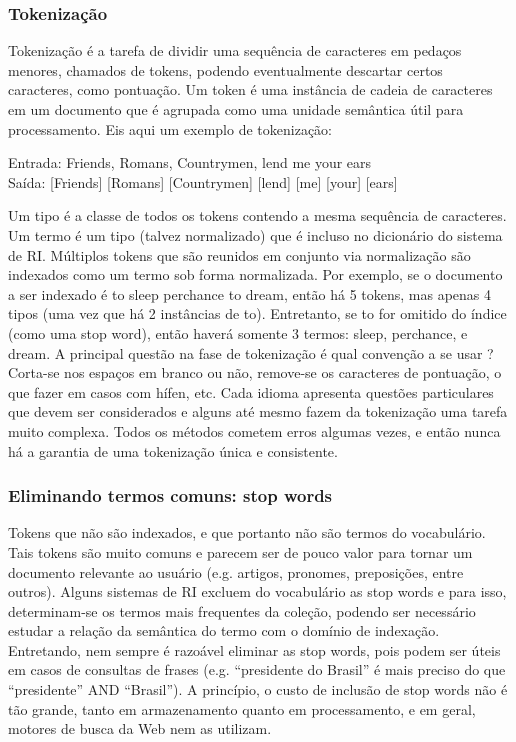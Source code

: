 \subsubsection{Tokenização}

Tokenização é a tarefa de dividir uma sequência de caracteres em pedaços menores, chamados de tokens, podendo eventualmente descartar certos caracteres, como pontuação. Um token é uma instância de cadeia de caracteres em um documento que é agrupada como uma unidade semântica útil para processamento.
Eis aqui um exemplo de tokenização:

Entrada: Friends, Romans, Countrymen, lend me your ears \\
Saída: [Friends] [Romans] [Countrymen] [lend] [me] [your] [ears]

Um tipo é a classe de todos os tokens contendo a mesma sequência de caracteres.
Um termo é um tipo (talvez normalizado) que é incluso no dicionário do sistema de RI.
Múltiplos tokens que são reunidos em conjunto via normalização são indexados como um termo sob forma normalizada. Por exemplo, se o documento a ser indexado é to sleep perchance to dream, então há 5 tokens, mas apenas 4 tipos (uma vez que há 2 instâncias de to). Entretanto, se to for omitido do índice (como uma stop word), então haverá somente 3 termos: sleep, perchance, e dream. 
A principal questão na fase de tokenização é qual convenção a se usar ? Corta-se nos espaços em branco ou não, remove-se os caracteres de pontuação, o que fazer em casos com hífen, etc. 
Cada idioma apresenta questões particulares que devem ser considerados e alguns até mesmo fazem da tokenização uma tarefa muito complexa.
Todos os métodos cometem erros algumas vezes, e então nunca há a garantia de uma tokenização única e consistente.

\subsubsection{Eliminando termos comuns: stop words}

Tokens que não são indexados, e que portanto não são termos do vocabulário.
Tais tokens são muito comuns e parecem ser de pouco valor para tornar um documento relevante ao usuário (e.g. artigos, pronomes, preposições, entre outros).
Alguns sistemas de RI excluem do vocabulário as stop words e para isso, determinam-se os termos mais frequentes da coleção, podendo ser necessário estudar a relação da semântica do termo com o domínio de indexação. Entretando, nem sempre é razoável eliminar as stop words, pois podem ser úteis em casos de consultas de frases (e.g. “presidente do Brasil” é mais preciso do que “presidente” AND “Brasil”).
A princípio, o custo de inclusão de stop words não é tão grande, tanto em armazenamento quanto em processamento, e em geral, motores de busca da Web nem as utilizam.

